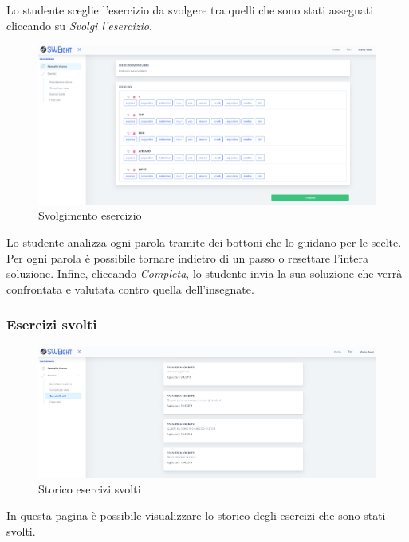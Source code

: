 		  Lo studente sceglie l'esercizio da svolgere tra quelli che sono stati assegnati cliccando su \textit{Svolgi l'esercizio}.   
       
        	\begin{figure}[H]
            	\centering
            	\includegraphics[width=17cm]{sez/img/studente/svolgimentoesercizio.PNG} 
            	\caption{Svolgimento esercizio}\label{fig:1}
        	\end{figure}      
          Lo studente analizza ogni parola tramite dei bottoni che lo guidano per le scelte. Per ogni parola è possibile tornare indietro di un passo o resettare l'intera soluzione. Infine, cliccando \textit{Completa}, lo studente invia la sua soluzione che verrà confrontata e valutata contro quella dell'insegnate.
        
        
        
        
        \subsubsection{Esercizi svolti}
        	\begin{figure}[H]
            	\centering
            	\includegraphics[width=17cm]{sez/img/studente/esercizisvolti.PNG} 
            	\caption{Storico esercizi svolti}\label{fig:1}
        	\end{figure}
          In questa pagina è possibile visualizzare lo storico degli esercizi che sono stati svolti.
        
